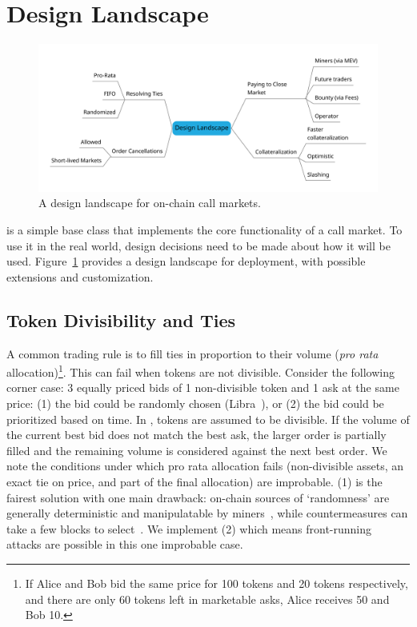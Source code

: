 \section{Design Landscape}

\begin{figure}[t]
\centering
\includegraphics[width=1\textwidth]{fig/MindMapDraft5.pdf}
\caption{\footnotesize{A design landscape for on-chain call markets.}  \label{fig:rmindmap}}
\end{figure}

\cm is a simple base class that implements the core functionality of a call market. To use it in the real world, design decisions need to be made about how it will be used. Figure~\ref{fig:rmindmap} provides a design landscape for \cm deployment, with possible extensions and customization.



\subsection{Token Divisibility and Ties}

A common trading rule is to fill ties in proportion to their volume (\ie \textit{pro rata} allocation)\footnote{If Alice and Bob bid the same price for 100 tokens and 20 tokens respectively, and there are only 60 tokens left in marketable asks, Alice receives 50 and Bob 10.}. This can fail when tokens are not divisible. Consider the following corner case: 3 equally priced bids of 1 non-divisible token and 1 ask at the same price: (1) the bid could be randomly chosen (\cf Libra~\cite{mavroudis2019libra}), or (2) the bid could be prioritized based on time. In \cm, tokens are assumed to be divisible. If the volume of the current best bid does not match the best ask, the larger order is partially filled and the remaining volume is considered against the next best order. We note the conditions under which pro rata allocation fails (\ie non-divisible assets, an exact tie on price, and part of the final allocation) are improbable. (1) is the fairest solution with one main drawback: on-chain sources of `randomness' are generally deterministic and manipulatable by miners~\cite{bonneau2015random,buenz2017proofs}, while countermeasures can take a few blocks to select~\cite{boneh2018verifiable}. We implement (2) which means front-running attacks are possible in this one improbable case. 

